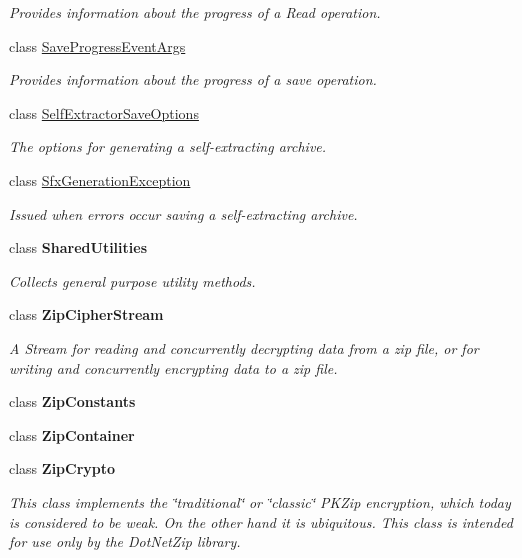\begin{DoxyCompactItemize}
\begin{DoxyCompactList}\small\item\em Provides information about the progress of a Read operation. \end{DoxyCompactList}\item 
class \mbox{\hyperlink{class_super_tiled2_unity_1_1_ionic_1_1_zip_1_1_save_progress_event_args}{Save\+Progress\+Event\+Args}}
\begin{DoxyCompactList}\small\item\em Provides information about the progress of a save operation. \end{DoxyCompactList}\item 
class \mbox{\hyperlink{class_super_tiled2_unity_1_1_ionic_1_1_zip_1_1_self_extractor_save_options}{Self\+Extractor\+Save\+Options}}
\begin{DoxyCompactList}\small\item\em The options for generating a self-\/extracting archive. \end{DoxyCompactList}\item 
class \mbox{\hyperlink{class_super_tiled2_unity_1_1_ionic_1_1_zip_1_1_sfx_generation_exception}{Sfx\+Generation\+Exception}}
\begin{DoxyCompactList}\small\item\em Issued when errors occur saving a self-\/extracting archive. \end{DoxyCompactList}\item 
class {\bfseries Shared\+Utilities}
\begin{DoxyCompactList}\small\item\em Collects general purpose utility methods. \end{DoxyCompactList}\item 
class {\bfseries Zip\+Cipher\+Stream}
\begin{DoxyCompactList}\small\item\em A Stream for reading and concurrently decrypting data from a zip file, or for writing and concurrently encrypting data to a zip file. \end{DoxyCompactList}\item 
class {\bfseries Zip\+Constants}
\item 
class {\bfseries Zip\+Container}
\item 
class {\bfseries Zip\+Crypto}
\begin{DoxyCompactList}\small\item\em This class implements the \char`\"{}traditional\char`\"{} or \char`\"{}classic\char`\"{} P\+K\+Zip encryption, which today is considered to be weak. On the other hand it is ubiquitous. This class is intended for use only by the Dot\+Net\+Zip library. \end{DoxyCompactList}\item 

\end{DoxyCompactItemize}
